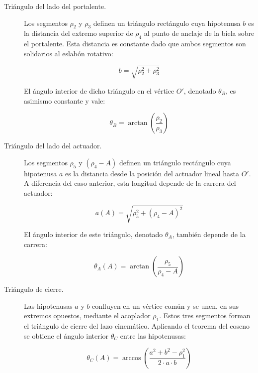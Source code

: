 \begin{description}
\item[Triángulo del lado del portalente.]
Los segmentos $\rho_2$ y $\rho_3$ definen un triángulo rectángulo cuya hipotenusa $b$ es la distancia del extremo superior de $\rho_4$ al punto de anclaje de la biela sobre el portalente. Esta distancia es constante dado que ambos segmentos son solidarios al eslabón rotativo:

\begin{equation}
    b = \sqrt{\rho_2^{2} + \rho_3^{2}}
    \label{eq:b_cenital}
\end{equation}

El ángulo interior de dicho triángulo en el vértice $O'$, denotado $\theta_{B}$, es asimismo constante y vale:

\begin{equation}
    \theta_{B} = \arctan\!\left( \frac{\rho_2}{\rho_3} \right)
    \label{eq:thetaB_cenital}
\end{equation}

\item[Triángulo del lado del actuador.]
Los segmentos $\rho_5$ y $(\rho_4 - A)$ definen un triángulo rectángulo cuya hipotenusa $a$ es la distancia desde la posición del actuador lineal hasta $O'$. A diferencia del 
caso anterior, esta longitud depende de la carrera del actuador:

\begin{equation}
    a(A) = \sqrt{\rho_5^{2} + (\rho_4 - A)^{2}}
    \label{eq:a_cenital}
\end{equation}

El ángulo interior de este triángulo, denotado $\theta_{A}$, también depende de la carrera:

\begin{equation}
    \theta_{A}(A) = \arctan\!\left( \frac{\rho_5}{\rho_4 - A} \right)
    \label{eq:thetaA_cenital}
\end{equation}

\item[Triángulo de cierre.]
Las hipotenusas $a$ y $b$ confluyen en un vértice común y se unen, en sus extremos opuestos, mediante el acoplador $\rho_1$. Estos tres segmentos forman el triángulo de cierre del lazo cinemático. Aplicando el teorema del coseno se obtiene el ángulo interior $\theta_{C}$ entre las hipotenusas:

\begin{equation}
    \theta_{C}(A) = \arccos\!\left( \frac{a^{2} + b^{2} - \rho_1^{2}}{2 \cdot a \cdot b} \right)
    \label{eq:thetaC_cenital}
\end{equation}


\end{description}

